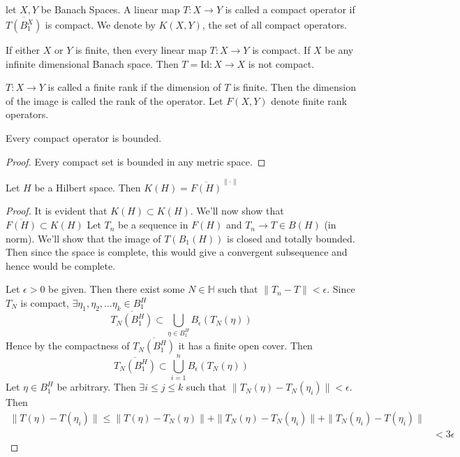 
\chapter{}

\begin{definition}
  let $X, Y$ be Banach Spaces. A linear map $T : X \to Y$ is called a
  compact operator if $\overline{T(B_1^X)}$ is compact. We denote by
  $K(X, Y)$, the set of all compact operators.
\end{definition}

\begin{example}
  If either $X$ or $Y$ is finite, then every linear map $T: X \to Y$
  is compact. If $X$ be any infinite dimensional Banach space. Then
  $T = \textrm{Id} : X \to X$ is not compact.
\end{example}

\begin{definition}
  $T: X \to Y$ is called a finite rank if the dimension of $T$ is
  finite. Then the dimension of the image is called the rank of the
  operator. Let $F(X, Y)$ denote finite rank operators.
\end{definition}

\begin{lemma}
  Every compact operator is bounded.
\end{lemma}
\begin{proof}
  Every compact set is bounded in any metric space.
\end{proof}

\begin{theorem}
  Let $H$ be a Hilbert space. Then $K(H) = \overline{F(H)}^{\|\cdot\|}$
\end{theorem}
\begin{proof}
  It is evident that $K(H) \subset K(H)$. We'll now show that
  $\overline{F(H)}\subset K(H) $
  Let $T_n$ be a sequence in $F(H)$ and $T_n \to T \in B(H)$ (in
  norm). We'll show that the image of $T(B_1(H))$ is closed and
  totally bounded. Then since the space is complete, this would give
  a convergent subsequence and hence would be complete.

  Let $\epsilon > 0$ be given. Then there exist some $N \in
  \mathbb{H}$ such that $\|T_n - T\| < \epsilon$. Since $T_N$ is
  compact, $\exists \eta_1, \eta_2, \ldots \eta_k \in B^H_1$ \[
    \overline{T_N(B_1^H)} \subset \bigcup_{\eta \in  B_1^H}
    B_\epsilon(T_N(\eta))
  \]
  Hence by the compactness of $\overline{T_N(B_1^H)}$ it has a finite
  open cover. Then \[
    \overline{T_N(B_1^H)} \subset \bigcup_{i = 1}^{n}B_\epsilon(T_N(\eta))
  \]
  Let $\eta \in B_1^H$ be arbitrary. Then $\exists i \le j \le k$
  such that $\|T_N(\eta) - T_N(\eta_i)\| < \epsilon$. Then
  \begin{align*}
    \|T(\eta) - T(\eta_i)\| \le \|T(\eta) - T_N(\eta)\| + \|T_N(\eta)
    - T_N(\eta_i)\| + \|T_N(\eta_i) - T(\eta_i)\| \\
    & < 3 \epsilon
  \end{align*}
\end{proof}


